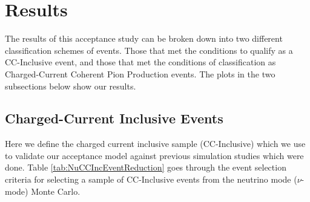 \documentclass[11pt]{article}
\begin{document}
\section{Results}\label{sec:Results}

The results of this acceptance study can be broken down into two different classification schemes of events. Those that met the conditions to qualify as a CC-Inclusive event, and those that met the conditions of classification as Charged-Current Coherent Pion Production events. The plots in the two subsections below show our results.

\subsection{Charged-Current Inclusive Events}\label{sub:CCInclusive}

Here we define the charged current inclusive sample (CC-Inclusive) which we use to validate our acceptance model against previous simulation studies which were done. Table \ref{tab:NuCCIncEventReduction} goes through the event selection criteria for selecting a sample of CC-Inclusive events from the neutrino mode ($\nu$-mode) Monte Carlo.
\end{document}
